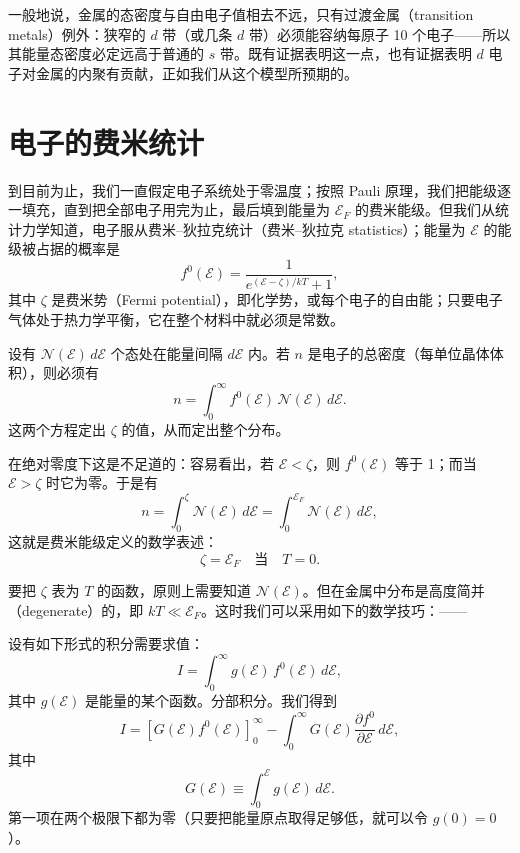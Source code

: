 一般地说，金属的态密度与自由电子值相去不远，只有过渡金属（transition metals）例外：狭窄的 $d$ 带（或几条 $d$ 带）必须能容纳每原子 10 个电子——所以其能量态密度必定远高于普通的 $s$ 带。既有证据表明这一点，也有证据表明 $d$ 电子对金属的内聚有贡献，正如我们从这个模型所预期的。

\section{电子的费米统计}

到目前为止，我们一直假定电子系统处于零温度；按照 Pauli 原理，我们把能级逐一填充，直到把全部电子用完为止，最后填到能量为 $\mathcal{E}_{F}$ 的费米能级。但我们从统计力学知道，电子服从费米–狄拉克统计（费米–狄拉克 statistics）；能量为 $\mathcal{E}$ 的能级被占据的概率是
\begin{equation*}
f^{0}(\mathcal{E})=\frac{1}{e^{(\mathcal{E}-\zeta)/kT}+1},
\tag{4.8}
\end{equation*}
其中 $\zeta$ 是费米势（Fermi potential），即化学势，或每个电子的自由能；只要电子气体处于热力学平衡，它在整个材料中就必须是常数。

设有 $\mathcal{N}(\mathcal{E})\,d\mathcal{E}$ 个态处在能量间隔 $d\mathcal{E}$ 内。若 $n$ 是电子的总密度（每单位晶体体积），则必须有
\begin{equation*}
n=\int_{0}^{\infty}f^{0}(\mathcal{E})\,\mathcal{N}(\mathcal{E})\,d\mathcal{E}.
\tag{4.9}
\end{equation*}
这两个方程定出 $\zeta$ 的值，从而定出整个分布。

在绝对零度下这是不足道的：容易看出，若 $\mathcal{E}<\zeta$，则 $f^{0}(\mathcal{E})$ 等于 1；而当 $\mathcal{E}>\zeta$ 时它为零。于是有
\begin{equation*}
n=\int_{0}^{\zeta}\mathcal{N}(\mathcal{E})\,d\mathcal{E}=\int_{0}^{\mathcal{E}_{F}}\mathcal{N}(\mathcal{E})\,d\mathcal{E},
\tag{4.10}
\end{equation*}
这就是费米能级定义的数学表述：
\begin{equation*}
\zeta=\mathcal{E}_{F}\quad\text{当}\quad T=0.
\tag{4.11}
\end{equation*}

要把 $\zeta$ 表为 $T$ 的函数，原则上需要知道 $\mathcal{N}(\mathcal{E})$。但在金属中分布是高度简并（degenerate）的，即 $kT\ll\mathcal{E}_{F}$。这时我们可以采用如下的数学技巧：——

设有如下形式的积分需要求值：
\begin{equation*}
I=\int_{0}^{\infty}g(\mathcal{E})\,f^{0}(\mathcal{E})\,d\mathcal{E},
\tag{4.12}
\end{equation*}
其中 $g(\mathcal{E})$ 是能量的某个函数。分部积分。我们得到
\begin{equation*}
I=\left[G(\mathcal{E})f^{0}(\mathcal{E})\right]_{0}^{\infty}-\int_{0}^{\infty}G(\mathcal{E})\frac{\partial f^{0}}{\partial\mathcal{E}}\,d\mathcal{E},
\tag{4.13}
\end{equation*}
其中
\begin{equation*}
G(\mathcal{E})\equiv\int_{0}^{\mathcal{E}}g(\mathcal{E})\,d\mathcal{E}.
\tag{4.14}
\end{equation*}
第一项在两个极限下都为零（只要把能量原点取得足够低，就可以令 $g(0)=0$）。

